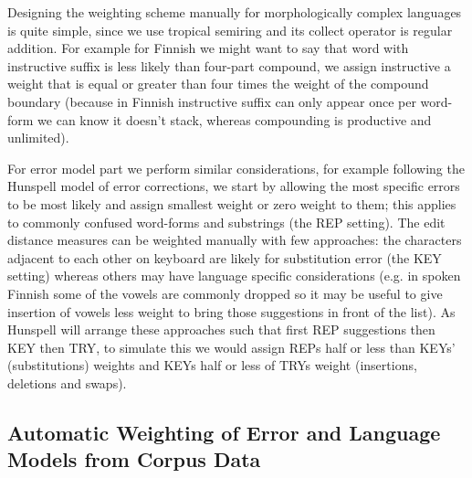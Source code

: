 \documentclass[a4paper,12pt]{article}
\begin{document}
Designing the weighting scheme manually for morphologically complex languages
is quite simple, since we use tropical semiring and its collect operator is
regular addition. For example for Finnish we might want to say that word with
instructive suffix is less likely than four-part compound, we assign
instructive a weight that is equal or greater than four times the weight of the
compound boundary (because in Finnish instructive suffix can only appear once
per word-form we can know it doesn't stack, whereas compounding is productive
and unlimited).

For error model part we perform similar considerations, for example following
the Hunspell model of error corrections, we start by allowing the most
specific errors to be most likely and assign smallest weight or zero weight
to them; this applies to commonly confused word-forms and substrings (the REP
setting). The edit distance measures can be weighted manually with few
approaches: the characters adjacent to each other on keyboard are likely
for substitution error (the KEY setting) whereas others may have language
specific considerations (e.g. in spoken Finnish some of the vowels are commonly
dropped so it may be useful to give insertion of vowels less weight to bring
those suggestions in front of the list). As Hunspell will arrange these
approaches such that first REP suggestions then KEY then TRY, to simulate this
we would assign REPs half or less than KEYs' (substitutions) weights and
KEYs half or less of TRYs weight (insertions, deletions and swaps).

\subsection{Automatic Weighting of Error and Language Models from Corpus Data}
\label{subsec:automatic-weighting}
\end{document}
